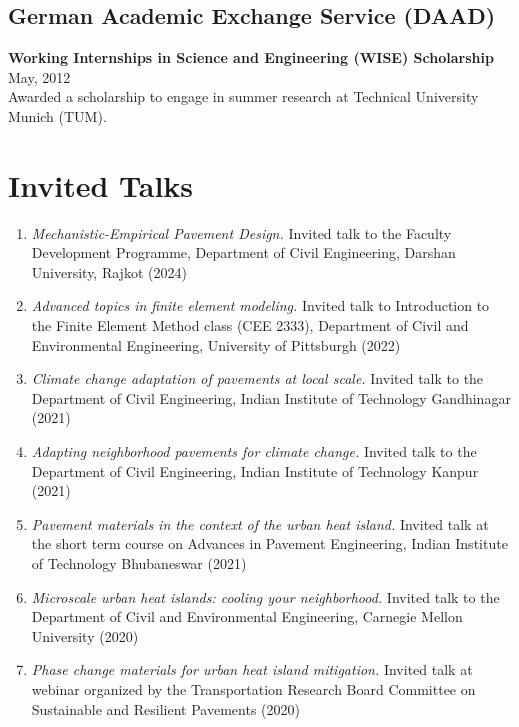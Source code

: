 \documentclass[12pt]{article}
\begin{document}
\subsection*{German Academic Exchange Service (DAAD)}
\textbf{Working Internships in Science and Engineering (WISE) Scholarship} \hfill May, 2012 \\
Awarded a scholarship to engage in summer research at Technical University Munich (TUM). 

\bigskip
\section*{Invited Talks}
\hfill
\begin{enumerate}[label=(N\arabic*)]
	\item \textit{Mechanistic-Empirical Pavement Design.} Invited talk to the Faculty Development Programme, Department of Civil Engineering, Darshan University, Rajkot (2024)
	\item \textit{Advanced topics in finite element modeling.} Invited talk to Introduction to the Finite Element Method class (CEE 2333), Department of Civil and Environmental Engineering, University of Pittsburgh (2022)
	\item \textit{Climate change adaptation of pavements at local scale.} Invited talk to the Department of Civil Engineering, Indian Institute of Technology Gandhinagar (2021)	
	\item \textit{Adapting neighborhood pavements for climate change.} Invited talk to the Department of Civil Engineering, Indian Institute of Technology Kanpur (2021)	
	\item \textit{Pavement materials in the context of the urban heat island.} Invited talk at the short term course on Advances in Pavement Engineering, Indian Institute of Technology Bhubaneswar (2021)	
	\item \textit{Microscale urban heat islands: cooling your neighborhood.} Invited talk to the Department of Civil and Environmental Engineering, Carnegie Mellon University (2020)
	\item \textit{Phase change materials for urban heat island mitigation.} Invited talk at webinar organized by the Transportation Research Board Committee on Sustainable and Resilient Pavements (2020)
\end{enumerate}

\bigskip
\end{document}
